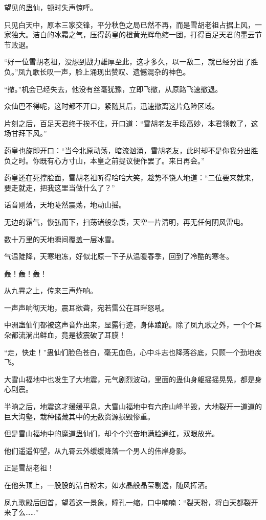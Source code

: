 \begin{this_body}
望见的蛊仙，顿时失声惊呼。

只见白天中，原本三家交锋，平分秋色之局已然不再，而是雪胡老祖占据上风，一家独大。洁白的冰霜之气，压得药皇的橙黄光辉龟缩一团，打得百足天君的墨云节节败退。

“好一位雪胡老祖，没想到战力雄厚至此，这才多久，以一敌二，就已经分出了胜负。”凤九歌长叹一声，脸上涌现出赞叹、遗憾混杂的神色。

“撤。”机会已经失去，他没有丝毫犹豫，立即飞撤，从原路飞速撤退。

众仙巴不得呢，这时都不开口，紧随其后，迅速撤离这片危险区域。

片刻之后，百足天君终于挨不住，开口道：“雪胡老友手段高妙，本君领教了，这场甘拜下风。”

药皇也旋即开口：“当今北原动荡，暗流汹涌，雪胡老友，此时却不是你我分出胜负之时。你既有心方寸山，本皇之前提议便作罢了。来日再会。”

药皇还在死撑脸面，雪胡老祖听得哈哈大笑，趁势不饶人地道：“二位要来就来，要走就走，把我这里当做什么了？”

话音刚落，天地陡然震荡，地动山摇。

无边的霜气，恢弘而下，扫荡诸般杂质，天空一片清明，再无任何阴风雷电。

数十万里的天地瞬间覆盖一层冰雪。

气温陡降，天寒地冻，好似北原一下子从温暖春季，回到了冷酷的寒冬。

轰！轰！轰！

从九霄之上，传来三声炸响。

一声声响彻天地，震耳欲聋，宛若雷公在耳畔怒吼。

中洲蛊仙们都被这声音炸出来，显露行迹，身体踉跄。除了凤九歌之外，一个个耳朵都流淌出鲜血，竟是被震破了耳膜！

“走，快走！”蛊仙们脸色苍白，毫无血色，心中斗志也降落谷底，只顾一个劲地疾飞。

大雪山福地中也发生了大地震，元气剧烈波动，里面的蛊仙身躯摇摇晃晃，都是身心剧震。

半晌之后，地震这才缓缓平息，大雪山福地中有六座山峰半毁，大地裂开一道道的巨大沟壑，栽种储藏其中的无数资源损毁惨重。

但是雪山福地中的魔道蛊仙们，却个个兴奋地满脸通红，双眼放光。

他们遥遥仰望，从九霄云外缓缓降落一个男人的伟岸身影。

正是雪胡老祖！

在他头顶上，一股股的洁白粉末，如水晶般晶莹剔透，随风挥洒。

凤九歌殿后回首，望着这一景象，瞳孔一缩，口中喃喃：“裂天粉，将白天都裂开来了么……”


\end{this_body}
